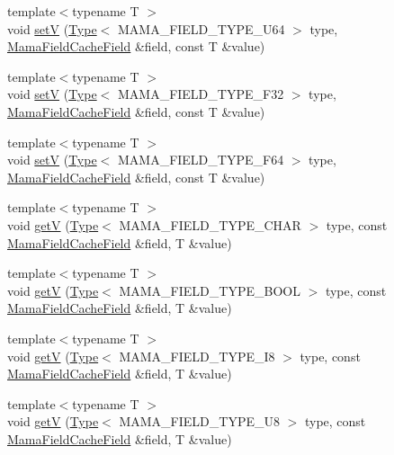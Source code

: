 \begin{DoxyCompactItemize}
\item 
{\footnotesize template$<$typename T $>$ }\\void \hyperlink{namespaceWombat_a48256649aa74f7146958e4186fa9d693}{setV} (\hyperlink{classWombat_1_1Type}{Type}$<$ MAMA\_\-FIELD\_\-TYPE\_\-U64 $>$ type, \hyperlink{classWombat_1_1MamaFieldCacheField}{MamaFieldCacheField} \&field, const T \&value)
\item 
{\footnotesize template$<$typename T $>$ }\\void \hyperlink{namespaceWombat_ae501feefba00a32661b4913f50aa4e03}{setV} (\hyperlink{classWombat_1_1Type}{Type}$<$ MAMA\_\-FIELD\_\-TYPE\_\-F32 $>$ type, \hyperlink{classWombat_1_1MamaFieldCacheField}{MamaFieldCacheField} \&field, const T \&value)
\item 
{\footnotesize template$<$typename T $>$ }\\void \hyperlink{namespaceWombat_aa5cabc1baf9ca64baffb75c48cea1294}{setV} (\hyperlink{classWombat_1_1Type}{Type}$<$ MAMA\_\-FIELD\_\-TYPE\_\-F64 $>$ type, \hyperlink{classWombat_1_1MamaFieldCacheField}{MamaFieldCacheField} \&field, const T \&value)
\item 
{\footnotesize template$<$typename T $>$ }\\void \hyperlink{namespaceWombat_a3f5716b3686dd27c341d508e2c38ca78}{getV} (\hyperlink{classWombat_1_1Type}{Type}$<$ MAMA\_\-FIELD\_\-TYPE\_\-CHAR $>$ type, const \hyperlink{classWombat_1_1MamaFieldCacheField}{MamaFieldCacheField} \&field, T \&value)
\item 
{\footnotesize template$<$typename T $>$ }\\void \hyperlink{namespaceWombat_a35a6e844a904961b48e8cc61077085a2}{getV} (\hyperlink{classWombat_1_1Type}{Type}$<$ MAMA\_\-FIELD\_\-TYPE\_\-BOOL $>$ type, const \hyperlink{classWombat_1_1MamaFieldCacheField}{MamaFieldCacheField} \&field, T \&value)
\item 
{\footnotesize template$<$typename T $>$ }\\void \hyperlink{namespaceWombat_a6a9c57fd79b5cc04510846013c84072b}{getV} (\hyperlink{classWombat_1_1Type}{Type}$<$ MAMA\_\-FIELD\_\-TYPE\_\-I8 $>$ type, const \hyperlink{classWombat_1_1MamaFieldCacheField}{MamaFieldCacheField} \&field, T \&value)
\item 
{\footnotesize template$<$typename T $>$ }\\void \hyperlink{namespaceWombat_a8e5c491e5005615cf95b04824d0c9204}{getV} (\hyperlink{classWombat_1_1Type}{Type}$<$ MAMA\_\-FIELD\_\-TYPE\_\-U8 $>$ type, const \hyperlink{classWombat_1_1MamaFieldCacheField}{MamaFieldCacheField} \&field, T \&value)

\end{DoxyCompactItemize}
